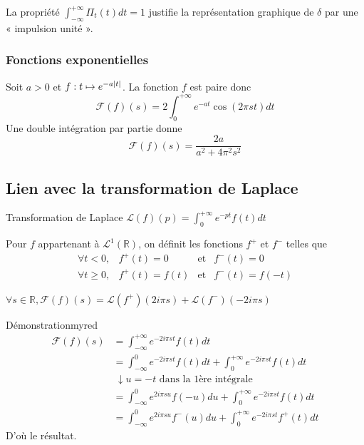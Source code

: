     La propriété $\int_{-\infty}^{+\infty} \Pi_t(t)dt = 1$ justifie la représentation graphique de $\delta$ par une « impulsion unité ».

    \subsubsection{Fonctions exponentielles}

    Soit $a > 0$ et $f : t \mapsto e^{-a\left\lvert t\right\rvert}$. La fonction $f$ est paire donc 
    \[ \mathcal{F}(f)(s) = 2 \int_{0}^{+\infty} e^{-at} \cos (2 \pi s t)dt \]
    Une double intégration par partie donne 
    \[ \mathcal{F}(f)(s) = \frac{2a}{a^2 + 4 \pi^2 s^2} \]

\subsection{Lien avec la transformation de Laplace}

    \begin{defi}{Transformation de Laplace}{}
        $\mathcal{L}(f)(p) = \int_{0}^{+ \infty} e^{-pt}f(t)dt$
    \end{defi}

    Pour $f$ appartenant à $\mathcal{L}^1(\mathbb{R})$, on définit les fonctions $f^+$ et $f^-$ telles que 
    \[ \begin{array}{llcl}
        \forall t < 0, & f^+(t) = 0 & \text{et} & f^-(t) = 0 \\
        \forall t \geq 0, & f^+(t) = f(t) & \text{et} & f^-(t) = f(-t) 
    \end{array} \]

    \begin{theo}{}{}
        $\forall s \in \mathbb{R}, \mathcal{F}(f)(s) = \mathcal{L}(f^+)(2i\pi s) + \mathcal{L}(f^-)(-2i\pi s)$
    \end{theo}

    \begin{demo}{Démonstration}{myred}
        \begin{align*}
            \mathcal{F}(f)(s) &= \int_{-\infty}^{+\infty} e^{-2i\pi st}f(t)dt \\
            &= \int_{-\infty}^{0} e^{-2i\pi st}f(t)dt + \int_{0}^{+\infty} e^{-2i\pi st}f(t)dt \\
            &\ \downarrow u = -t \text{ dans la 1ère intégrale} \\
            &= \int_{-\infty}^{0} e^{2i\pi su}f(-u)du + \int_{0}^{+\infty} e^{-2i\pi st}f(t)dt \\
            &= \int_{-\infty}^{0} e^{2i\pi su}f^-(u)du + \int_{0}^{+\infty} e^{-2i\pi st}f^+(t)dt 
        \end{align*}
        D’où le résultat.
    \end{demo}

